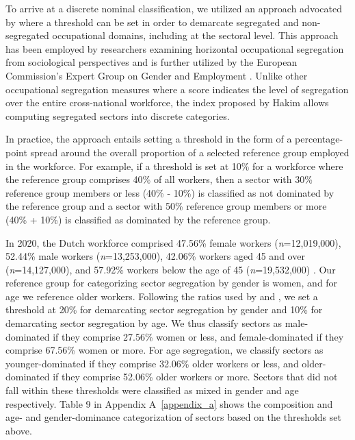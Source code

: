 \documentclass[jou]{apa7}
\begin{document}
To arrive at a discrete nominal classification, we utilized an approach advocated by \textcite{hakimSegregatedIntegratedOccupations1993} where a threshold can be set in order to demarcate segregated and non-segregated occupational domains, including at the sectoral level. This approach has been employed by researchers examining horizontal occupational segregation from sociological perspectives \parencite[e.g.,][]{jacobsTheoreticalMeasurementIssues1993,vanderlippeComparativeResearchWomen2002} and is further utilized by the European Commission’s Expert Group on Gender and Employment \parencite[EGGE;][]{bettioGenderSegregationLabour2009}. Unlike other occupational segregation measures where a score indicates the level of segregation over the entire cross-national workforce, the index proposed by Hakim allows computing segregated sectors into discrete categories.

In practice, the approach entails setting a threshold in the form of a percentage-point spread around the overall proportion of a selected reference group employed in the workforce. For example, if a threshold is set at 10\% for a workforce where the reference group comprises 40\% of all workers, then a sector with 30\% reference group members or less (40\% - 10\%) is classified as not dominated by the reference group and a sector with 50\% reference group members or more (40\% + 10\%) is classified as dominated by the reference group.

In 2020, the Dutch workforce comprised 47.56\% female workers (\textit{n}=12,019,000), 52.44\% male workers (\textit{n}=13,253,000), 42.06\% workers aged 45 and over (\textit{n}=14,127,000), and 57.92\% workers below the age of 45 (\textit{n}=19,532,000) \parencite{centraalbureauvoordestatistiekSustainableDevelopmentGoals2019,oecdOECDLabourForce2020}. Our reference group for categorizing sector segregation by gender is women, and for age we reference older workers. Following the ratios used by \textcite{hakimSegregatedIntegratedOccupations1993} and \textcite{bettioGenderSegregationLabour2009}, we set a threshold at 20\% for demarcating sector segregation by gender and 10\% for demarcating sector segregation by age. We thus classify sectors as male-dominated if they comprise 27.56\% women or less, and female-dominated if they comprise 67.56\% women or more. For age segregation, we classify sectors as younger-dominated if they comprise 32.06\% older workers or less, and older-dominated if they comprise 52.06\% older workers or more. Sectors that did not fall within these thresholds were classified as mixed in gender and age respectively. Table 9 in Appendix A~\ref{appendix_a} shows the composition and age- and gender-dominance categorization of sectors based on the thresholds set above.
\end{document}
